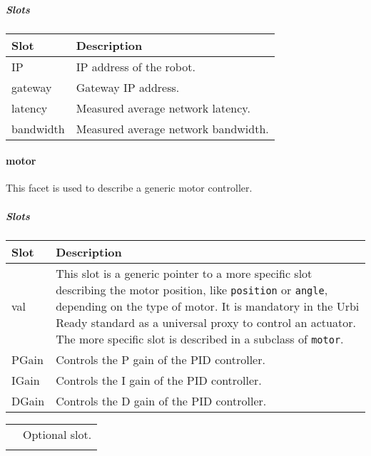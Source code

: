 \documentclass[a4paper]{article}
\begin{document}
\subparagraph{Slots}

\begin{flushleft}
\tablehead{}
\begin{supertabular}{|m{2.8669999cm}|m{12.422cm}|}
\hline
\sffamily\bfseries Slot &
\sffamily\bfseries Description\\\hline
IP &
\sffamily IP address of the robot.\\\hline
gateway &
\sffamily Gateway IP address.\\\hline
latency &
\sffamily Measured average network
latency.\\\hline
bandwidth &
\sffamily Measured average network
bandwidth.\\\hline
\end{supertabular}
\end{flushleft}
\paragraph{motor}

{\sffamily
This facet is used to describe a generic motor controller.}

\subparagraph{Slots}

\begin{flushleft}
\tablehead{}
\begin{supertabular}{|m{2.8669999cm}|m{12.422cm}|}
\hline
\sffamily\bfseries Slot &
\sffamily\bfseries Description\\\hline
val &
\sffamily This slot is a generic pointer to a
more specific slot describing the motor position, like
\texttt{position} or \texttt{angle}, depending on the type of motor. It
is mandatory in the Urbi Ready standard as a universal proxy to control
an actuator. The more specific slot is described in a subclass of
\texttt{motor}.\\\hline
PGain &
\sffamily Controls the P gain of the PID
controller.\\\hline
IGain &
\sffamily Controls the I gain of the PID
controller.\\\hline
DGain &
\sffamily Controls the D gain of the PID
controller.\\\hline
\end{supertabular}
\end{flushleft}
\begin{flushleft}
\tablehead{}
\begin{supertabular}{|m{1.717cm}|m{10.464cm}}
\hhline{-~}
 &
\sffamily Optional slot.\\\hhline{-~}
\end{supertabular}
\end{flushleft}
\end{document}
